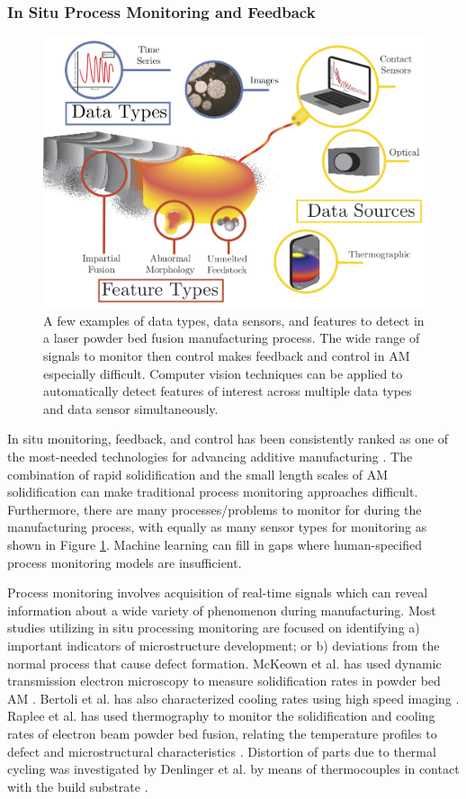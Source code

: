 \subsubsection{In Situ Process Monitoring and Feedback}
\begin{figure}
	\includegraphics[width=0.85\linewidth]{Images/melt_pool}
	\caption{A few examples of data types, data sensors, and features to detect in a laser powder bed fusion manufacturing process. The wide range of signals to monitor then control makes feedback and control in AM especially difficult. Computer vision techniques can be applied to automatically detect features of interest across multiple data types and data sensor simultaneously.}
	\label{fig:melt_pool}
\end{figure}

In situ monitoring, feedback, and control has been consistently ranked as one of the most-needed technologies for advancing additive manufacturing \cite{Berumen2010, Tapia2014, Mani2017}. The combination of rapid solidification and the small length scales of AM solidification can make traditional process monitoring approaches difficult. Furthermore, there are many processes/problems to monitor for during the manufacturing process, with equally as many sensor types for monitoring as shown in Figure \ref{fig:melt_pool}. Machine learning can fill in gaps where human-specified process monitoring models are insufficient.

Process monitoring involves acquisition of real-time signals which can reveal information about a wide variety of phenomenon during manufacturing. Most studies utilizing in situ processing monitoring are focused on identifying a) important indicators of microstructure development; or b) deviations from the normal process that cause defect formation. McKeown et al. has used dynamic transmission electron microscopy to measure solidification rates in powder bed AM \cite{McKeown2016}. Bertoli et al. has also characterized cooling rates using high speed imaging \cite{Bertoli2017}. Raplee et al. has used thermography to monitor the solidification and cooling rates of electron beam powder bed fusion, relating the temperature profiles to defect and microstructural characteristics \cite{Raplee2017}. Distortion of parts due to thermal cycling was investigated by Denlinger et al. by means of thermocouples in contact with the build substrate \cite{Denlinger2015}. 


